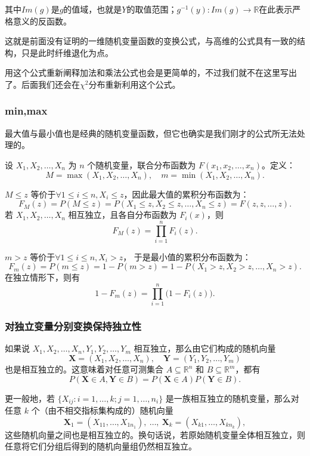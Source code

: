 其中$Im(g)$是$g$的值域，也就是$Y$的取值范围；$g^{-1}(y):Im(g)\to \mathbb{R}$在此表示严格意义的反函数。

这就是前面没有证明的一维随机变量函数的变换公式，与高维的公式具有一致的结构，只是此时纤维退化为点。

用这个公式重新阐释加法和乘法公式也会是更简单的，不过我们就不在这里写出了。后面我们还会在$\chi^2$分布重新利用这个公式。

\subsubsection{min,max}

最大值与最小值也是经典的随机变量函数，但它也确实是我们刚才的公式所无法处理的。

设 \(X_1, X_2, \dots, X_n\) 为 \(n\) 个随机变量，联合分布函数为 \(F(x_1, x_2, \dots, x_n)\)。定义：
\[
M = \max(X_1, X_2, \dots, X_n), \quad m = \min(X_1, X_2, \dots, X_n).
\]

$M \le z$ 等价于$\forall 1\leq i\leq n,X_i\leq z$，因此最大值的累积分布函数为：
\[
F_M(z) = P(M \le z) = P(X_1 \le z, X_2 \le z, \dots, X_n \le z) = F(z, z, \dots, z).
\]
若 \(X_1, X_2, \dots, X_n\) 相互独立，且各自分布函数为 \(F_i(x)\)，则
\[
F_M(z) = \prod_{i=1}^n F_i(z).
\]

$m > z$ 等价于$\forall 1\leq i\leq n,X_i> z$，
于是最小值的累积分布函数为：
\[
F_m(z) = P(m \le z) = 1 - P(m > z) = 1 - P(X_1 > z, X_2 > z, \dots, X_n > z).
\]
在独立情形下，则有
\[
1-F_m(z) = \prod_{i=1}^n \bigl(1 - F_i(z)\bigr).
\]

\subsubsection{对独立变量分别变换保持独立性}

如果说 \(X_1, X_2, \dots, X_n, Y_1, Y_2, \dots, Y_m\) 相互独立，那么由它们构成的随机向量
\[
\mathbf{X} = (X_1, X_2, \dots, X_n), \quad \mathbf{Y} = (Y_1, Y_2, \dots, Y_m)
\]
也是相互独立的。这意味着对任意可测集合 \(A \subseteq \mathbb{R}^n\) 和 \(B \subseteq \mathbb{R}^m\)，都有
\[
P(\mathbf{X} \in A, \mathbf{Y} \in B) = P(\mathbf{X} \in A) P(\mathbf{Y} \in B).
\]

更一般地，若 \(\{X_{ij} : i = 1, \dots, k; j = 1, \dots, n_i\}\) 是一族相互独立的随机变量，那么对任意 \(k\) 个（由不相交指标集构成的）随机向量
\[
\mathbf{X}_1 = (X_{11}, \dots, X_{1n_1}), \ \dots, \ \mathbf{X}_k = (X_{k1}, \dots, X_{kn_k}),
\]
这些随机向量之间也是相互独立的。换句话说，若原始随机变量全体相互独立，则任意将它们分组后得到的随机向量组仍然相互独立。

